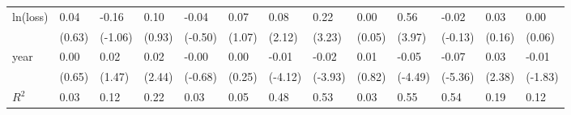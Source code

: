 \begin{tabular}{p{1.5cm} p{1.7cm} p{1.7cm} p{1.7cm}  p{1.7cm} p{1.7cm} p{1.7cm} p{1.7cm} p{1.7cm}  p{1.7cm} p{1.7cm} p{1.7cm} p{1.7cm} }
\hline
ln(loss)        &     0.04         &    -0.16         &     0.10         &    -0.04         &     0.07         &     0.08\sym{*}  &     0.22\sym{**} &     0.00         &     0.56\sym{***}&    -0.02         &     0.03         &     0.00         \\
                &   (0.63)         &  (-1.06)         &   (0.93)         &  (-0.50)         &   (1.07)         &   (2.12)         &   (3.23)         &   (0.05)         &   (3.97)         &  (-0.13)         &   (0.16)         &   (0.06)         \\
year            &     0.00         &     0.02         &     0.02\sym{*}  &    -0.00         &     0.00         &    -0.01\sym{***}&    -0.02\sym{***}&     0.01         &    -0.05\sym{***}&    -0.07\sym{***}&     0.03\sym{*}  &    -0.01         \\
                &   (0.65)         &   (1.47)         &   (2.44)         &  (-0.68)         &   (0.25)         &  (-4.12)         &  (-3.93)         &   (0.82)         &  (-4.49)         &  (-5.36)         &   (2.38)         &  (-1.83)         \\
\hline
\(R^{2}\)       &     0.03         &     0.12         &     0.22         &     0.03         &     0.05         &     0.48         &     0.53         &     0.03         &     0.55         &     0.54         &     0.19         &     0.12         \\
\end{tabular}
\def\sym#1{\ifmmode^{#1}\else\(^{#1}\)\fi}
